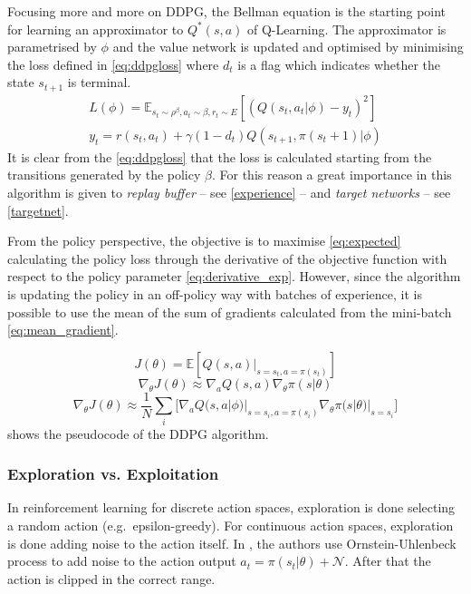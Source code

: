 Focusing more and more on DDPG, the Bellman equation is the starting point for learning an approximator to $Q^*(s,a)$ of Q-Learning. The approximator is parametrised by $\phi$ and the value network is updated and optimised by minimising the loss defined in \vref{eq:ddpgloss} where $d_t$ is a flag which indicates whether the  state $s_{t+1}$ is terminal.
\begin{equation}\label{eq:ddpgloss}
	\begin{gathered}
		L(\phi) = \mathbb{E}_{s_t\sim \rho^\beta, a_t\sim \beta,r_t\sim E}[(Q(s_t, a_t|\phi)-y_t)^2] \\
		y_t = r(s_t, a_t) + \gamma (1-d_t)Q(s_{t+1}, \pi(s_t+1)|\phi)
	\end{gathered}
\end{equation}
It is clear from the \vref{eq:ddpgloss} that the loss is calculated starting from the transitions generated by the policy $\beta$. For this reason a great importance in this algorithm is given to \textit{replay buffer} -- see \vref{experience} -- and \textit{target networks} -- see \vref{targetnet}.

From the policy perspective, the objective is to maximise \vref{eq:expected} calculating the policy loss through the derivative of the objective function with respect to the policy parameter \vref{eq:derivative_exp}. However, since the algorithm is updating the policy in an off-policy way with batches of experience, it is possible to use the mean of the sum of gradients calculated from the mini-batch \vref{eq:mean_gradient}.

\begin{equation}\label{eq:expected}
	J(\theta) = \mathbb{E}[Q(s,a)|_{s=s_t,a=\pi(s_t)}]
\end{equation}
\begin{equation}\label{eq:derivative_exp}
	\nabla_{\theta} J(\theta) \approx \nabla_a Q(s,a) \nabla_{\theta}\pi(s|\theta)
\end{equation}
\begin{equation}\label{eq:mean_gradient}
	\nabla_{\theta} J(\theta) \approx \frac{1}{N}\sum_{i}\big[\nabla_a Q(s,a| \phi)|_{s=s_i, a = \pi(s_i)} \nabla_{\theta}\pi(s|\theta)|_{s=s_i}\big]
\end{equation}
 shows the pseudocode of the DDPG algorithm.

\subsubsection{Exploration vs. Exploitation}
In reinforcement learning for discrete action spaces, exploration is done selecting a random action (e.g.\ epsilon-greedy). For continuous action spaces, exploration is done adding noise to the action itself. In \cite{lillicrap2015continuous}, the authors use Ornstein-Uhlenbeck process \cite{uhlenbeck1930theory} to add noise to the action output $
	a_t = \pi(s_t|\theta) + \mathcal{N}$. After that the action is clipped in the correct range.


